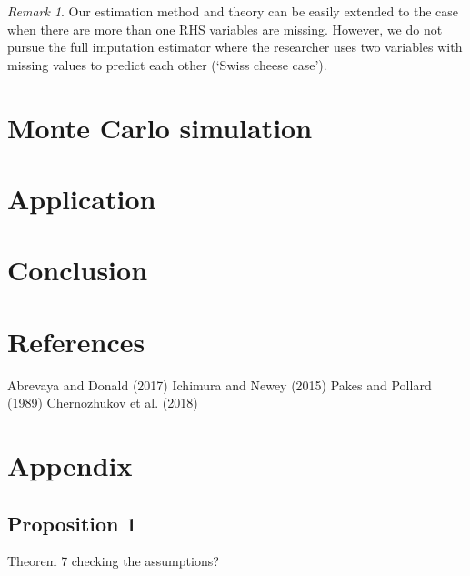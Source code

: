 \documentclass{article}
\theoremstyle{definition}
\theoremstyle{remark}
\newtheorem{remark}{Remark}
\begin{document}
\begin{remark}
	Our estimation method and theory can be easily extended to the case when there are more than one RHS variables are missing. However, we do not pursue the full imputation estimator where the researcher uses two variables with missing values to predict each other (`Swiss cheese case').
\end{remark}

\section{Monte Carlo simulation}


\section{Application}


\section{Conclusion}

\section{References}

Abrevaya and Donald (2017)
Ichimura and Newey (2015)
Pakes and Pollard (1989)
Chernozhukov et al. (2018)

\section{Appendix}

\subsection{Proposition 1}
Theorem 7 checking the assumptions?
\end{document}
